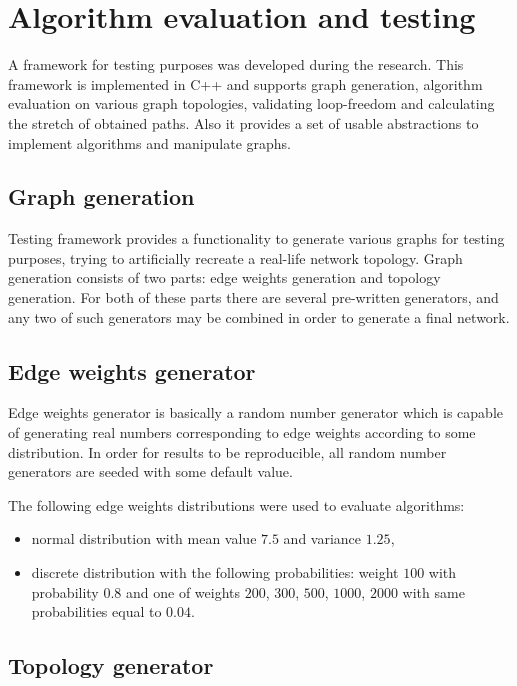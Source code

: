 \section{Algorithm evaluation and testing}
\label{sec:testing}

A framework for testing purposes was developed during the research. This framework is implemented in C++ and supports graph generation, algorithm evaluation on various graph topologies, validating loop-freedom and calculating the stretch of obtained paths. Also it provides a set of usable abstractions to implement algorithms and manipulate graphs.

\subsection{Graph generation}
Testing framework provides a functionality to generate various graphs for testing purposes, trying to artificially recreate a real-life network topology. Graph generation consists of two parts: edge weights generation and topology generation. For both of these parts there are several pre-written generators, and any two of such generators may be combined in order to generate a final network.

\subsection{Edge weights generator}

Edge weights generator is basically a random number generator which is capable of generating real numbers corresponding to edge weights according to some distribution. In order for results to be reproducible, all random number generators are seeded with some default value.

The following edge weights distributions were used to evaluate algorithms:
\begin{itemize}
\item normal distribution with mean value $7.5$ and variance $1.25$,
\item discrete distribution with the following probabilities: weight $100$ with probability $0.8$ and one of weights $200$, $300$, $500$, $1000$, $2000$ with same probabilities equal to $0.04$.
\end{itemize}

\subsection{Topology generator}

